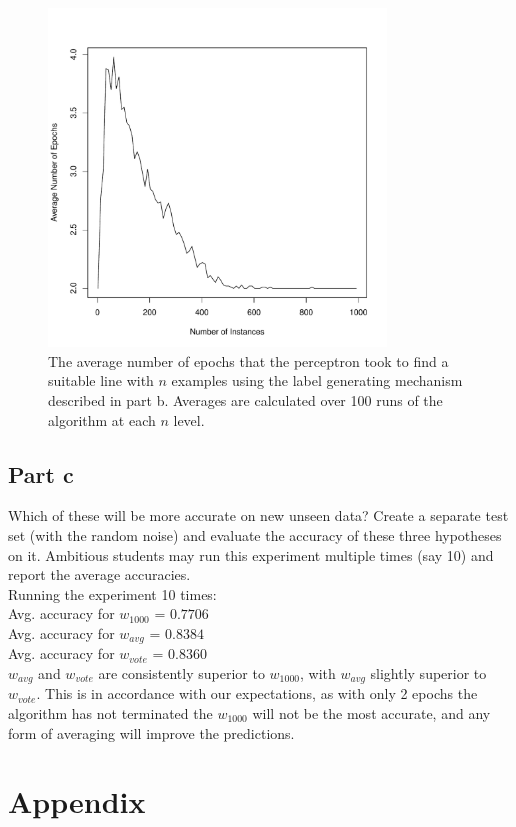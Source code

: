 \documentclass{article}
\begin{document}
\begin{figure}[h!]
\centering
\includegraphics[width=0.8\textwidth]{epochsB.pdf}
\caption{The average number of epochs that the perceptron took to find a suitable line with $n$ examples using the label generating mechanism described in part b.
Averages are calculated over 100 runs of the algorithm at each $n$ level.
}
\label{epoch}
\end{figure}


\subsection*{Part c}

Which of these will be more accurate on new unseen data? Create a separate test set (with the random noise) and evaluate the accuracy of these three hypotheses on it. Ambitious students may run this experiment multiple times (say 10) and report the average accuracies.
\\
Running the experiment 10 times: \\
Avg. accuracy for $w_{1000}$ = $0.7706$ \\
Avg. accuracy for $w_{avg}$ = $0.8384$ \\
Avg. accuracy for $w_{vote}$ = $0.8360$ \\

\noindent $w_{avg}$ and $w_{vote}$ are consistently superior to $w_{1000}$, with $w_{avg}$ slightly superior to $w_{vote}$.
This is in accordance with our expectations, as with only 2 epochs the algorithm has not terminated the $w_{1000}$ will not be the most accurate, and any form of averaging will improve the predictions. 
\clearpage
\section{Appendix}





\end{document}
